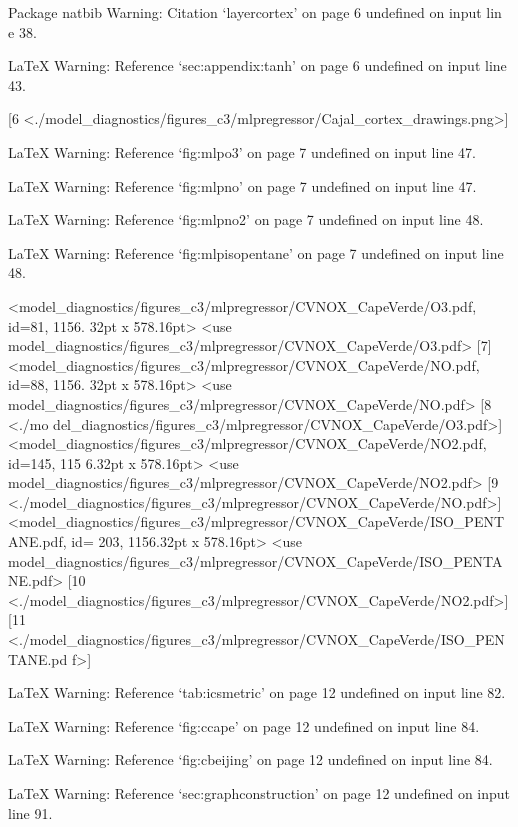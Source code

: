 Package natbib Warning: Citation `layercortex' on page 6 undefined on input lin
e 38.


LaTeX Warning: Reference `sec:appendix:tanh' on page 6 undefined on input line 
43.

[6 <./model_diagnostics/figures_c3/mlpregressor/Cajal_cortex_drawings.png>]

LaTeX Warning: Reference `fig:mlpo3' on page 7 undefined on input line 47.


LaTeX Warning: Reference `fig:mlpno' on page 7 undefined on input line 47.


LaTeX Warning: Reference `fig:mlpno2' on page 7 undefined on input line 48.


LaTeX Warning: Reference `fig:mlpisopentane' on page 7 undefined on input line 
48.


<model_diagnostics/figures_c3/mlpregressor/CVNOX_CapeVerde/O3.pdf, id=81, 1156.
32pt x 578.16pt>
<use model_diagnostics/figures_c3/mlpregressor/CVNOX_CapeVerde/O3.pdf> [7]
<model_diagnostics/figures_c3/mlpregressor/CVNOX_CapeVerde/NO.pdf, id=88, 1156.
32pt x 578.16pt>
<use model_diagnostics/figures_c3/mlpregressor/CVNOX_CapeVerde/NO.pdf> [8 <./mo
del_diagnostics/figures_c3/mlpregressor/CVNOX_CapeVerde/O3.pdf>]
<model_diagnostics/figures_c3/mlpregressor/CVNOX_CapeVerde/NO2.pdf, id=145, 115
6.32pt x 578.16pt>
<use model_diagnostics/figures_c3/mlpregressor/CVNOX_CapeVerde/NO2.pdf>
[9 <./model_diagnostics/figures_c3/mlpregressor/CVNOX_CapeVerde/NO.pdf>]
<model_diagnostics/figures_c3/mlpregressor/CVNOX_CapeVerde/ISO_PENTANE.pdf, id=
203, 1156.32pt x 578.16pt>
<use model_diagnostics/figures_c3/mlpregressor/CVNOX_CapeVerde/ISO_PENTANE.pdf>
[10 <./model_diagnostics/figures_c3/mlpregressor/CVNOX_CapeVerde/NO2.pdf>]
[11 <./model_diagnostics/figures_c3/mlpregressor/CVNOX_CapeVerde/ISO_PENTANE.pd
f>]

LaTeX Warning: Reference `tab:icsmetric' on page 12 undefined on input line 82.



LaTeX Warning: Reference `fig:ccape' on page 12 undefined on input line 84.


LaTeX Warning: Reference `fig:cbeijing' on page 12 undefined on input line 84.


LaTeX Warning: Reference `sec:graphconstruction' on page 12 undefined on input 
line 91.

